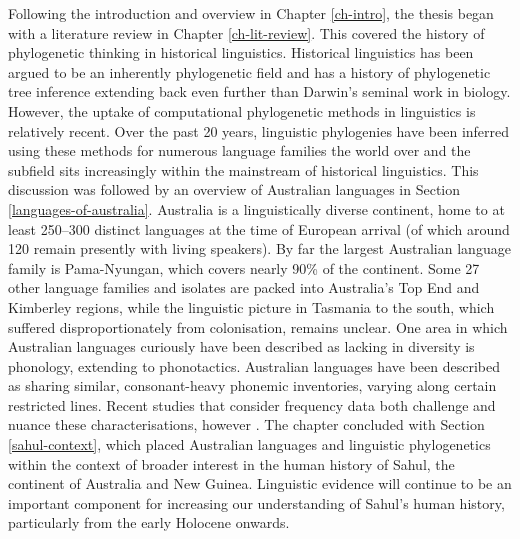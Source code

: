 Following the introduction and overview in Chapter \ref{ch-intro}, the thesis began with a literature review in Chapter \ref{ch-lit-review}. This covered the history of phylogenetic thinking in historical linguistics. Historical linguistics has been argued to be an inherently phylogenetic field \autocite{dunn_language_2015} and has a history of phylogenetic tree inference extending back even further than Darwin's seminal work in biology. However, the uptake of computational phylogenetic methods in linguistics is relatively recent. Over the past 20 years, linguistic phylogenies have been inferred using these methods for numerous language families the world over and the subfield sits increasingly within the mainstream of historical linguistics. This discussion was followed by an overview of Australian languages in Section \ref{languages-of-australia}. Australia is a linguistically diverse continent, home to at least 250--300 distinct languages at the time of European arrival (of which around 120 remain presently with living speakers). By far the largest Australian language family is Pama-Nyungan, which covers nearly 90\% of the continent. Some 27 other language families and isolates are packed into Australia's Top End and Kimberley regions, while the linguistic picture in Tasmania to the south, which suffered disproportionately from colonisation, remains unclear. One area in which Australian languages curiously have been described as lacking in diversity is phonology, extending to phonotactics. Australian languages have been described as sharing similar, consonant-heavy phonemic inventories, varying along certain restricted lines. Recent studies that consider frequency data both challenge and nuance these characterisations, however \autocites{gasser_revisiting_2014}{round_segment_2021}{round_phonotactics_2021}. The chapter concluded with Section \ref{sahul-context}, which placed Australian languages and linguistic phylogenetics within the context of broader interest in the human history of Sahul, the continent of Australia and New Guinea. Linguistic evidence will continue to be an important component for increasing our understanding of Sahul's human history, particularly from the early Holocene onwards.

